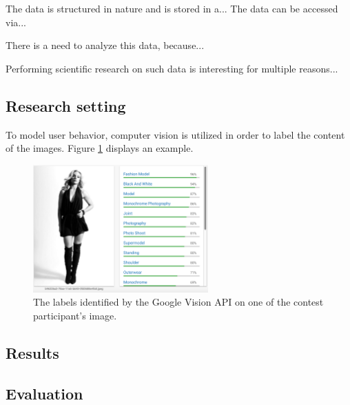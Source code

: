     The data is structured in nature and is stored in a... The data can be accessed via...

    There is a need to analyze this data, because...

    Performing scientific research on such data is interesting for multiple reasons...

\subsection{Research setting}
    To model user behavior, computer vision is utilized in order to label the content of the images. Figure \ref{google_vision_labels} displays an example.  

    \begin{figure}[h] 
		\begin{center}
			\includegraphics[width=0.6\textwidth]{images/google_vision_labels.png}
			\caption{The labels identified by the Google Vision API on one of the contest participant's image.}
			\label{google_vision_labels}
		\end{center}
	\end{figure}

\subsection{Results}


\subsection{Evaluation}
